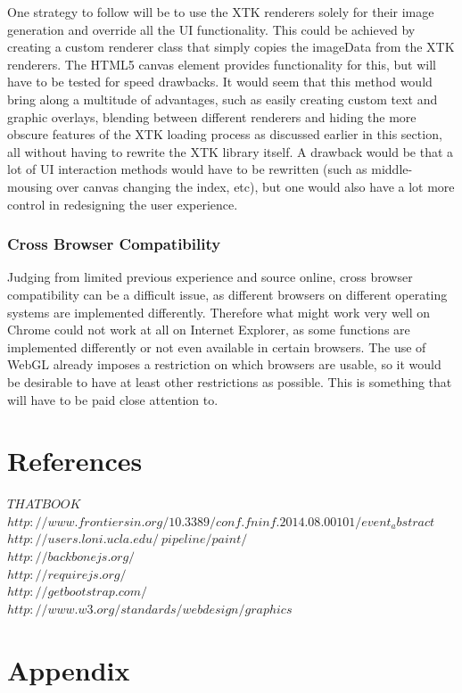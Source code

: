 \documentclass[a4paper,11pt,titlepage]{article}
\begin{document}
One strategy to follow will be to use the XTK renderers solely for their image generation and override all the UI functionality. This could be achieved by creating a custom renderer class that simply copies the imageData from the XTK renderers. The HTML5 canvas element provides functionality for this, but will have to be tested for speed drawbacks. It would seem that this method would bring along a multitude of advantages, such as easily creating custom text and graphic overlays, blending between different renderers and hiding the more obscure features of the XTK loading process as discussed earlier in this section, all without having to rewrite the XTK library itself. A drawback would be that a lot of UI interaction methods would have to be rewritten (such as middle-mousing over canvas changing the index, etc), but one would also have a lot more control in redesigning the user experience.

\subsubsection{Cross Browser Compatibility}

Judging from limited previous experience and source online, cross browser compatibility can be a difficult issue, as different browsers on different operating systems are implemented differently. Therefore what might work very well on Chrome could not work at all on Internet Explorer, as some functions are implemented differently or not even available in certain browsers. The use of WebGL already imposes a restriction on which browsers are usable, so it would be desirable to have at least other restrictions as possible. This is something that will have to be paid close attention to.


\section{References}
$THAT BOOK$\\
$http://www.frontiersin.org/10.3389/conf.fninf.2014.08.00101/event_abstract$\\
$http://users.loni.ucla.edu/~pipeline/paint/$\\
$http://backbonejs.org/$\\
$http://requirejs.org/$\\
$http://getbootstrap.com/$\\
$http://www.w3.org/standards/webdesign/graphics$\\

\section{Appendix}
\end{document}
